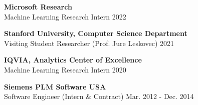 \documentclass[margin,line,pifont,palatino,courier]{res}
\begin{document}
\begin{resume}
\textbf{Microsoft Research} \\
Machine Learning Research Intern \hfill 2022

\textbf{Stanford University, Computer Science Department} \\
Visiting Student Researcher (Prof. Jure Leskovec)                                    \hfill  2021

\textbf{IQVIA, Analytics Center of Excellence} \\
Machine Learning Research Intern                                     \hfill 2020

\textbf{Siemens PLM Software USA} \\
Software Engineer (Intern \& Contract)                  \hfill Mar. 2012 - Dec. 2014



\end{resume}
\end{document}

